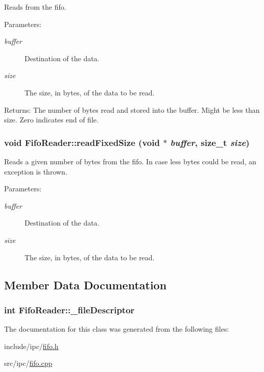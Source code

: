 Reads from the fifo.

\begin{Desc}
\item[Parameters:]
\begin{description}
\item[{\em buffer}]Destination of the data. \item[{\em size}]The size, in bytes, of the data to be read. \end{description}
\end{Desc}
\begin{Desc}
\item[Returns:]The number of bytes read and stored into the buffer. Might be less than size. Zero indicates end of file. \end{Desc}
\hypertarget{classFifoReader_0731d94742fb3dddf17f8a2343b235fb}{
\subsubsection[{readFixedSize}]{\setlength{\rightskip}{0pt plus 5cm}void FifoReader::readFixedSize (void $\ast$ {\em buffer}, \/  size\_\-t {\em size})}}
\label{classFifoReader_0731d94742fb3dddf17f8a2343b235fb}


Reads a given number of bytes from the fifo. In case less bytes could be read, an exception is thrown.

\begin{Desc}
\item[Parameters:]
\begin{description}
\item[{\em buffer}]Destination of the data. \item[{\em size}]The size, in bytes, of the data to be read. \end{description}
\end{Desc}


\subsection{Member Data Documentation}
\hypertarget{classFifoReader_9836b5e989e4e977b331bdd43f481cd5}{
\subsubsection[{\_\-fileDescriptor}]{\setlength{\rightskip}{0pt plus 5cm}int {\bf FifoReader::\_\-fileDescriptor}}}
\label{classFifoReader_9836b5e989e4e977b331bdd43f481cd5}




The documentation for this class was generated from the following files:\begin{CompactItemize}
\item 
include/ipc/\hyperlink{fifo_8h}{fifo.h}\item 
src/ipc/\hyperlink{fifo_8cpp}{fifo.cpp}\end{CompactItemize}

